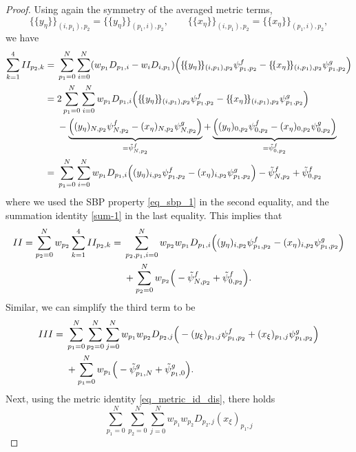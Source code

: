 \documentclass[fleqn,11pt]{amsart}
\begin{document}
{\begin{proof}
Using again the symmetry of the averaged metric terms,
\[
\{\!\{y_{\eta}\}\!\}_{(i,p_1),p_2}
=
\{\!\{y_{\eta}\}\!\}_{(p_1,i),p_2},
\qquad
\{\!\{x_{\eta}\}\!\}_{(i,p_1),p_2}
=
\{\!\{x_{\eta}\}\!\}_{(p_1,i),p_2},
\]
we have 
\begin{align*}
\sum_{k=1}^4 II_{p_2,k}
   = &\; \sum_{p_1=0}^N\sum_{i=0}^N(w_{p_1}D_{p_1,i}-w_{i}D_{i,p_1})\Big(\{\!\{y_{\eta}\}\!\}_{(i,p_1),p_2}
\psi^f_{p_1,p_2}
-
\{\!\{x_{\eta}\}\!\}_{(i,p_1),p_2}\psi^g_{p_1,p_2}\Big)\\
   = &\; 2\sum_{p_1=0}^N\sum_{i=0}^Nw_{p_1}D_{p_1,i}\Big(\{\!\{y_{\eta}\}\!\}_{(i,p_1),p_2}
\psi^f_{p_1,p_2}
-
\{\!\{x_{\eta}\}\!\}_{(i,p_1),p_2}\psi^g_{p_1,p_2}\Big)\\
&\; - 
\underbrace{\Big((y_{\eta})_{N,p_2}
\psi^f_{N,p_2}
-(x_{\eta})_{N,p_2}\psi^g_{N,p_2}
\Big)}_{=\Tilde{\psi}^f_{N, p_2}}
+
\underbrace{\Big((y_{\eta})_{0,p_2}
\psi^f_{0,p_2}
-(x_{\eta})_{0,p_2}\psi^g_{0,p_2}
\Big)}_{=\Tilde{\psi}^f_{0, p_2}}\\
   = &\; \sum_{p_1=0}^N\sum_{i=0}^Nw_{p_1}D_{p_1,i}\Big((y_{\eta})_{i,p_2}
\psi^f_{p_1,p_2}
-
(x_{\eta})_{i,p_2}\psi^g_{p_1,p_2}\Big) - \Tilde{\psi}^f_{N, p_2} + \Tilde{\psi}^f_{0, p_2}
\end{align*}
where we used the SBP property \eqref{eq_sbp_1} in the second equality, and 
the summation identity \eqref{sum-1} in the last equality.
This implies that 
\begin{align}
    II = 
\sum_{p_2=0}^Nw_{p_2}  \sum_{k=1}^4 II_{p_2,k}
=&\; 
\sum_{p_2, p_1, i=0}^Nw_{p_2} w_{p_1}D_{p_1,i}\Big((y_{\eta})_{i,p_2}
\psi^f_{p_1,p_2}-
(x_{\eta})_{i,p_2}\psi^g_{p_1,p_2}\Big) \nonumber\\
&\;
+
\sum_{p_2=0}^Nw_{p_2}\Big(-\Tilde{\psi}^f_{N, p_2} + \Tilde{\psi}^f_{0, p_2}\Big).
\end{align}
Similar, we can simplify the third term to be 
\begin{align}
    III = &\;
\sum_{p_1=0}^N\sum_{p_2=0}^N\sum_{j=0}^Nw_{p_1} w_{p_2}D_{p_2,j}\Big(-(y_{\xi})_{p_1,j}
\psi^f_{p_1,p_2}+
(x_{\xi})_{p_1,j}\psi^g_{p_1,p_2}\Big) 
\nonumber\\
&\;+
\sum_{p_1=0}^Nw_{p_1}\Big(-\Tilde{\psi}^g_{p_1, N} + \Tilde{\psi}^g_{p_1, 0}\Big).
\end{align}
Next, using the metric identity \eqref{eq_metric_id_dis}, there holds 
\[
\sum_{p_1=0}^N\sum_{p_2=0}^N\sum_{j=0}^Nw_{p_1} w_{p_2}D_{p_2,j}(x_{\xi})_{p_1,j}
\]
\end{proof}}
\end{document}
